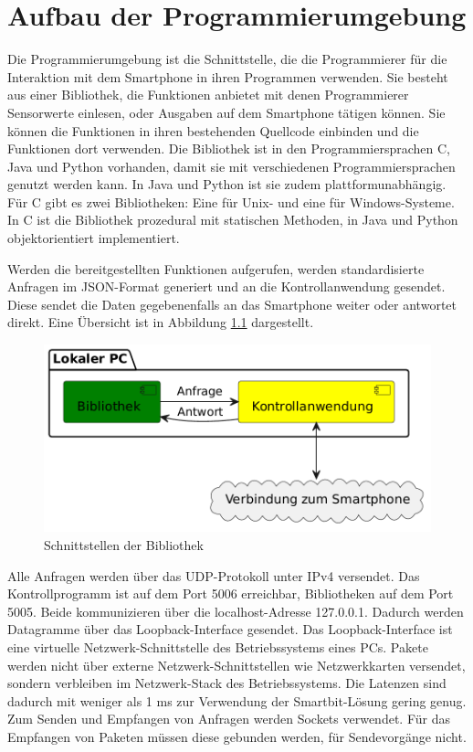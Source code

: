 \documentclass[11pt,a4paper]{report}
\begin{document}
\chapter{Aufbau der Programmierumgebung}\label{chap:libs}
Die Programmierumgebung ist die Schnittstelle, die die Programmierer für die Interaktion mit dem Smartphone in ihren Programmen verwenden.
Sie besteht aus einer Bibliothek, die Funktionen anbietet mit denen Programmierer Sensorwerte einlesen, oder Ausgaben auf dem Smartphone tätigen können.
Sie können die Funktionen in ihren bestehenden Quellcode einbinden und die Funktionen dort verwenden.
Die Bibliothek ist in den Programmiersprachen C, Java und Python vorhanden, damit sie mit verschiedenen Programmiersprachen genutzt werden kann.
In Java und Python ist sie zudem plattformunabhängig.
Für C gibt es zwei Bibliotheken: Eine für Unix- und eine für Windows-Systeme.
In C ist die Bibliothek prozedural mit statischen Methoden, in Java und Python objektorientiert implementiert.

Werden die bereitgestellten Funktionen aufgerufen, werden standardisierte Anfragen im JSON-Format generiert und an die Kontrollanwendung gesendet.
Diese sendet die Daten gegebenenfalls an das Smartphone weiter oder antwortet direkt.
Eine Übersicht ist in Abbildung \ref{fig:Schnittstelle Bibliothek} dargestellt.
\begin{figure}[htbp]
  \centering
  \includegraphics[width=.8\textwidth]{images/lib_server_connection}
  \caption{Schnittstellen der Bibliothek}
  \label{fig:Schnittstelle Bibliothek}
\end{figure}

Alle Anfragen werden über das UDP-Protokoll unter IPv4 versendet.
Das Kontrollprogramm ist auf dem Port 5006 erreichbar, Bibliotheken auf dem Port 5005.
Beide kommunizieren über die localhost-Adresse 127.0.0.1.
Dadurch werden Datagramme über das Loopback-Interface gesendet.
Das Loopback-Interface ist eine virtuelle Netzwerk-Schnittstelle des Betriebssystems eines PCs.
Pakete werden nicht über externe Netzwerk-Schnittstellen wie Netzwerkkarten versendet, sondern verbleiben im Netzwerk-Stack des Betriebssystems.
Die Latenzen sind dadurch mit weniger als 1 ms zur Verwendung der Smartbit-Lösung gering genug.
Zum Senden und Empfangen von Anfragen werden Sockets verwendet.
Für das Empfangen von Paketen müssen diese gebunden werden, für Sendevorgänge nicht.
\end{document}
